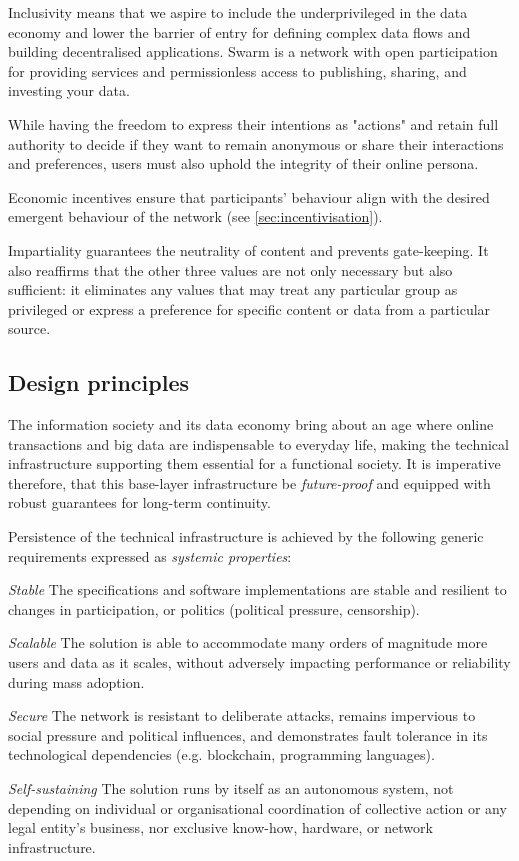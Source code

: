 Inclusivity means that we aspire to include the underprivileged in the data economy and lower the barrier of entry for defining complex data flows and building decentralised applications. Swarm is a network with open participation for 
providing services and permissionless access to publishing, sharing, and investing your data.

While having the freedom to express their intentions as "actions" and retain full authority to decide if they want to remain anonymous or share their interactions and preferences, users must also uphold the integrity of their online persona. 

Economic incentives ensure that participants' behaviour align with the desired emergent behaviour of the network (see \ref{sec:incentivisation}). 

Impartiality guarantees the neutrality of content and prevents gate-keeping. It also reaffirms that the other three values are not only necessary but also sufficient: it eliminates any values that may treat any particular group as privileged or express a preference for specific content or data from a particular source. 

\subsection{Design principles \statusorange}\label{sec:design-principles}
 

The information society and its data economy bring about an age where online transactions and big data are indispensable to everyday life, making the technical infrastructure supporting them essential for a functional society. It is imperative therefore, that this base-layer infrastructure be \emph{future-proof} and equipped with robust guarantees for long-term continuity. 

Persistence of the technical infrastructure is achieved by the following generic requirements expressed as \emph{systemic properties}:

\begin{labelledlist}
\item[\emph{Stable}] The specifications and software implementations are stable and resilient to changes in participation, or politics (political pressure, censorship).
\item[\emph{Scalable}] The solution is able to accommodate many orders of magnitude more users and data as it scales, without adversely impacting performance or reliability during mass adoption.  
\item[\emph{Secure}] The network is resistant to deliberate attacks, remains impervious to social pressure and political influences, and demonstrates fault tolerance in its technological dependencies (e.g. blockchain, programming languages). 
\item[\emph{Self-sustaining}] The solution runs by itself as an autonomous system, not depending on individual or organisational coordination of collective action or any legal entity's business, nor exclusive know-how, hardware, or network infrastructure. 
\end{labelledlist}




